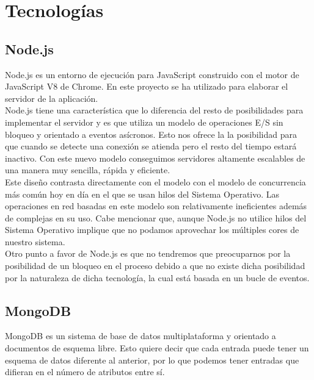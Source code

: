\chapter{Tecnologías}

\section{Node.js}

Node.js es un entorno de ejecución para JavaScript construido con el motor de JavaScript
V8 de Chrome. En este proyecto se ha utilizado para elaborar el servidor de la aplicación.\\

Node.js tiene una característica que lo diferencia del resto de posibilidades para implementar 
el servidor y es que utiliza un modelo de operaciones E/S sin bloqueo y orientado a eventos 
asícronos. Esto nos ofrece la la posibilidad para que cuando se detecte una conexión se atienda
pero el resto del tiempo estará inactivo. Con este nuevo modelo conseguimos servidores altamente 
escalables de una manera muy sencilla, rápida y eficiente.\\


Este diseño contrasta directamente con el modelo con el modelo de concurrencia más común hoy en 
día en el que se usan hilos del Sistema Operativo. Las operaciones en red basadas en este modelo
son relativamente ineficientes además de complejas en su uso. Cabe mencionar que, aunque Node.js 
no utilice hilos del Sistema Operativo implique que no podamos aprovechar los múltiples cores
de nuestro sistema.\\

Otro punto a favor de Node.js es que no tendremos que preocuparnos por la posibilidad de un 
bloqueo en el proceso debido a que no existe dicha posibilidad por la naturaleza de dicha 
tecnología, la cual está basada en un bucle de eventos.

\section{MongoDB}

MongoDB es un sistema de base de datos multiplataforma y orientado a documentos de esquema libre.
Esto quiere decir que cada entrada puede tener un esquema de datos diferente al anterior, por
lo que podemos tener entradas que difieran en el número de atributos entre sí.\\

